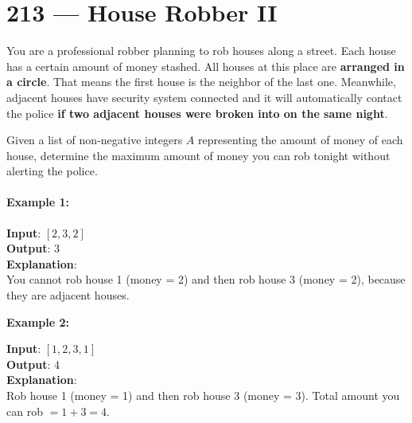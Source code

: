 \section{213 --- House Robber II}
You are a professional robber planning to rob houses along a street. Each house has a certain amount of money stashed. All houses at this place are \textbf{arranged in a circle}. That means the first house is the neighbor of the last one. Meanwhile, adjacent houses have security system connected and it will automatically contact the police \textbf{if two adjacent houses were broken into on the same night}.
\par
Given a list of non-negative integers $A$ representing the amount of money of each house, determine the maximum amount of money you can rob tonight without alerting the police.
\paragraph{Example 1:}
\begin{flushleft}
\textbf{Input}: $[2,3,2]$
\\
\textbf{Output}: 3
\\
\textbf{Explanation}: 
\\
You cannot rob house 1 (money = 2) and then rob house 3 (money = 2), because they are adjacent houses.
\end{flushleft}
\textbf{Example 2:}
\begin{flushleft}
\textbf{Input}: $[1,2,3,1]$
\\
\textbf{Output}: 4
\\
\textbf{Explanation}: 
\\
Rob house 1 (money = 1) and then rob house 3 (money = 3). Total amount you can rob $= 1 + 3 = 4$.
\end{flushleft}
